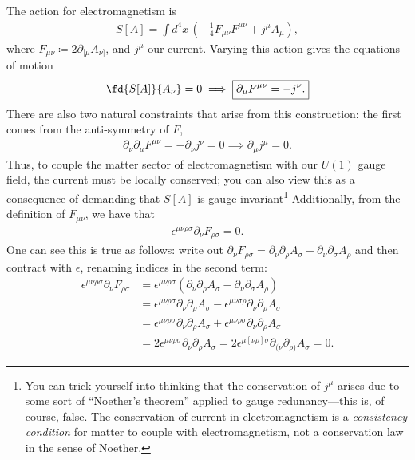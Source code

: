 \documentclass[11pt]{article}
\begin{document}
The action for electromagnetism is
\begin{align*}
    S[A] = \int d^4 x \, \left( - \frac{1}{4} F_{\mu \nu} F^{\mu \nu} + j^\mu A_\mu \right),
\end{align*}
where $F_{\mu \nu} \coloneqq 2 \partial_{[\mu} A_{\nu]}$, and $j^\mu$ our current.
Varying this action gives the equations of motion
\begin{align*}
    \fd{S[A]}{A_\nu} = 0 \implies \boxed{\partial_\mu F^{\mu \nu} = - j^\nu.}
\end{align*}
There are also two natural constraints that arise from this construction:
the first comes from the anti-symmetry of $F$,
\begin{align*}
    \partial_\nu \partial_\mu F^{\mu \nu} = - \partial_\nu j^\nu = 0 \implies \boxed{\partial_\mu j^\mu = 0.}
\end{align*}
Thus, to couple the matter sector of electromagnetism with our $U(1)$ gauge
field, the current must be locally conserved; you can also view this as a consequence
of demanding that $S[A]$ is gauge invariant\footnote{You can trick yourself into thinking
that the conservation of $j^\mu$ arises due to some sort of ``Noether's theorem'' applied to 
gauge redunancy---this is, of course, false. The conservation of current in electromagnetism
is a \emph{consistency condition} for matter to couple with electromagnetism, not a conservation
law in the sense of Noether.} Additionally, from the definition of $F_{\mu \nu}$, we have that
\begin{align*}
    \boxed{\epsilon^{\mu \nu \rho \sigma} \partial_\nu F_{\rho \sigma} = 0.}
\end{align*}
One can see this is true as follows: write out $\partial_\nu F_{\rho \sigma} = \partial_\nu \partial_\rho A_\sigma - \partial_\nu \partial_\sigma A_\rho$
and then contract with $\epsilon$, renaming indices in the second term:
\begin{align*}
    \epsilon^{\mu \nu \rho \sigma} \partial_\nu F_{\rho \sigma}
    & = \epsilon^{\mu \nu \rho \sigma} (\partial_\nu \partial_\rho A_\sigma - \partial_\nu \partial_\sigma A_\rho)\\
    & = \epsilon^{\mu \nu \rho \sigma} \partial_\nu \partial_\rho A_\sigma - \epsilon^{\mu \nu \sigma \rho} \partial_\nu \partial_\rho A_\sigma\\
    & = \epsilon^{\mu \nu \rho \sigma} \partial_\nu \partial_\rho A_\sigma + \epsilon^{\mu \nu \rho \sigma} \partial_\nu \partial_\rho A_\sigma\\
    & = 2 \epsilon^{\mu \nu \rho \sigma} \partial_\nu \partial_\rho A_\sigma = 2 \epsilon^{\mu [\nu \rho] \sigma} \partial_{(\nu} \partial_{\rho)} A_\sigma = 0.
\end{align*}
\end{document}
